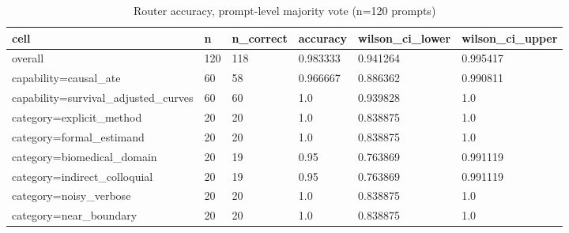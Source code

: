\begin{table}[ht]
\centering
\caption{Router accuracy, prompt-level majority vote (n=120 prompts)}
\label{tab:router_accuracy_majority_vote}
\begin{tabular}{llllll}
\toprule
cell & n & n\_correct & accuracy & wilson\_ci\_lower & wilson\_ci\_upper \\
\midrule
overall & 120 & 118 & 0.983333 & 0.941264 & 0.995417 \\
capability=causal\_ate & 60 & 58 & 0.966667 & 0.886362 & 0.990811 \\
capability=survival\_adjusted\_curves & 60 & 60 & 1.0 & 0.939828 & 1.0 \\
category=explicit\_method & 20 & 20 & 1.0 & 0.838875 & 1.0 \\
category=formal\_estimand & 20 & 20 & 1.0 & 0.838875 & 1.0 \\
category=biomedical\_domain & 20 & 19 & 0.95 & 0.763869 & 0.991119 \\
category=indirect\_colloquial & 20 & 19 & 0.95 & 0.763869 & 0.991119 \\
category=noisy\_verbose & 20 & 20 & 1.0 & 0.838875 & 1.0 \\
category=near\_boundary & 20 & 20 & 1.0 & 0.838875 & 1.0 \\
\bottomrule
\end{tabular}
\end{table}
